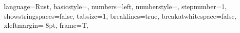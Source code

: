 \usepackage{outlines}

% 


\newcommand{\figref}[1]{Figure \ref{#1}}
\newcommand{\lstref}[1]{Listing \ref{#1}}
\newcommand{\tabref}[1]{Table \ref{#1}}

\usepackage{listings, listings-rust}
\usepackage[framemethod=TikZ]{mdframed}
\lstset
{
	language=Rust,
	basicstyle=\footnotesize,
	numbers=left,
	numberstyle=\tiny,
	stepnumber=1,
	showstringspaces=false,
	tabsize=1,
	breaklines=true,
	breakatwhitespace=false,
	xleftmargin=-8pt,
	frame=T,
}
\newcommand{\codefileNoFigure}[3]{
	\mdframed[roundcorner=5pt, backgroundcolor=blue!30]
	
	\endmdframed
}
\newcommand{\codefileRustNoFigure}[3]{
	\mdframed[roundcorner=5pt, backgroundcolor=blue!30]
	
	\endmdframed
}
\newcommand{\codefile}[3]{
	\begin{figure}[H]
		\codefileNoFigure{#1}{#2}{#3}
	\end{figure}
}
